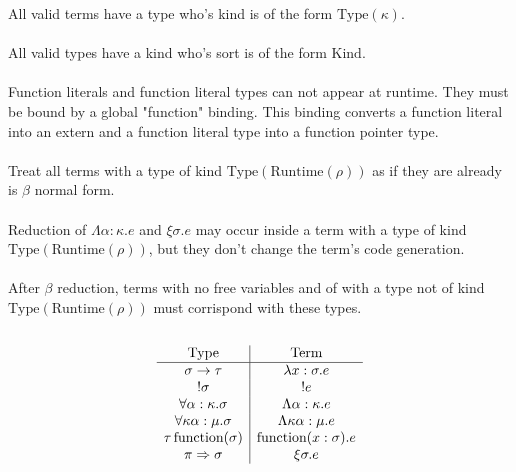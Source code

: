 \documentclass {article}
\begin{document}
All valid terms have a type who's kind is of the form $ \text{Type} (\kappa) $. \\
\\
All valid types have a kind who's sort is of the form $ \text{Kind} $.\\
\\
Function literals and function literal types can not appear at runtime. They must be bound by a global "function" binding.
This binding converts a function literal into an extern and a function literal type into a function pointer type. \\
\\
Treat all terms with a type of kind $ \text{Type} (\text{Runtime} (\rho)) $ as if they are already is $ \beta $ normal form. \\
\\
Reduction of $ \Lambda \alpha : \kappa. e $ and $ \xi \sigma. e $ may occur inside a term with a type of kind $ \text{Type} (\text{Runtime} (\rho)) $, but they don't
change the term's code generation. \\
\\
After $ \beta $ reduction, terms with no free variables and of with a type not of kind $ \text{Type} (\text{Runtime} (\rho) ) $ must corrispond with these types. \\
\\
\begin{gather*}
\begin{array}{c | c}
\text{Type} & \text{Term} \\
\hline
\sigma \to \tau & \lambda x : \sigma. e \\
!\sigma & !e \\
\forall \alpha : \kappa. \sigma & \Lambda \alpha : \kappa. e  \\
\forall \kappa \alpha : \mu. \sigma & \Lambda \kappa \alpha : \mu. e \\
\tau \, \text{function} (\sigma) & \text{function}(x : \sigma). e \\
\pi \Rightarrow \sigma & \xi \sigma. e
\end{array}
\end{gather*}
\end{document}

